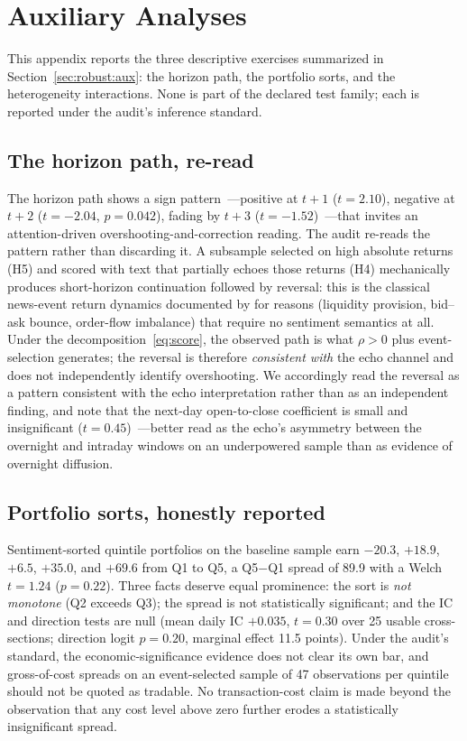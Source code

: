 

\section{Auxiliary Analyses}\label{sec:appaux}

This appendix reports the three descriptive exercises summarized in Section~\ref{sec:robust:aux}: the horizon path, the portfolio sorts, and the heterogeneity interactions. None is part of the declared test family; each is reported under the audit's inference standard.

\subsection{The horizon path, re-read}

The horizon path shows a sign pattern~---positive at $t+1$ ($t=2.10$), negative at $t+2$ ($t=-2.04$, $p=0.042$), fading by $t+3$ ($t=-1.52$)~---that invites an attention-driven overshooting-and-correction reading. The audit re-reads the pattern rather than discarding it. A subsample selected on high absolute returns (H5) and scored with text that partially echoes those returns (H4) mechanically produces short-horizon continuation followed by reversal: this is the classical news-event return dynamics documented by \citet{chan2003} for reasons (liquidity provision, bid--ask bounce, order-flow imbalance) that require no sentiment semantics at all. Under the decomposition~\eqref{eq:score}, the observed path is what $\rho>0$ plus event-selection generates; the reversal is therefore \emph{consistent with} the echo channel and does not independently identify overshooting. We accordingly read the reversal as a pattern consistent with the echo interpretation rather than as an independent finding, and note that the next-day open-to-close coefficient is small and insignificant ($t=0.45$)~---better read as the echo's asymmetry between the overnight and intraday windows on an underpowered sample than as evidence of overnight diffusion.

\subsection{Portfolio sorts, honestly reported}

Sentiment-sorted quintile portfolios on the baseline sample earn $-20.3$, $+18.9$, $+6.5$, $+35.0$, and $+69.6$ \bps{} from Q1 to Q5, a Q5$-$Q1 spread of 89.9 \bps{} with a Welch $t=1.24$ ($p=0.22$). Three facts deserve equal prominence: the sort is \emph{not monotone} (Q2 exceeds Q3); the spread is not statistically significant; and the IC and direction tests are null (mean daily IC $+0.035$, $t=0.30$ over 25 usable cross-sections; direction logit $p=0.20$, marginal effect 11.5 points). Under the audit's standard, the economic-significance evidence does not clear its own bar, and gross-of-cost spreads on an event-selected sample of 47 observations per quintile should not be quoted as tradable. No transaction-cost claim is made beyond the observation that any cost level above zero further erodes a statistically insignificant spread.

